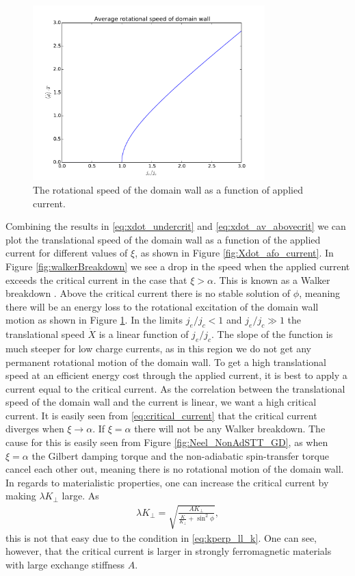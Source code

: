 \documentclass[12pt, a4paper]{article}		%
\numberwithin{equation}{section}
\begin{document}
\begin{figure}[h!]
\begin{center}
\includegraphics[width=0.8\textwidth]{Figures/criticalCurrentPhidot.pdf} 
\caption{The rotational speed of the domain wall as a function of applied current.}
\label{fig:phidot_afo_current} 
\end{center}
\end{figure}
Combining the results in \eqref{eq:xdot_undercrit} and \eqref{eq:xdot_av_abovecrit} we can plot the translational speed of the domain wall as a function of the applied current for different values of $\xi$, as shown in Figure \ref{fig:Xdot_afo_current}. In Figure \ref{fig:walkerBreakdown} we see a drop in the speed when the applied current exceeds the critical current in the case that $\xi > \alpha$. This is known as a Walker breakdown \cite{SchryerWalker1974}. Above the critical current there is no stable solution of $\phi$, meaning there will be an energy loss to the rotational excitation of the domain wall motion as shown in Figure \ref{fig:phidot_afo_current}. In the limits $j_e/j_c < 1$ and $j_e/j_c \gg 1$ the translational speed $\dot{X}$ is a linear function of $j_e/j_c$. The slope of the function is much steeper for low charge currents, as in this region we do not get any permanent rotational motion of the domain wall. To get a high translational speed at an efficient energy cost through the applied current, it is best to apply a current equal to the critical current. As the correlation between the translational speed of the domain wall and the current is linear, we want a high critical current. It is easily seen from \eqref{eq:critical_current} that the critical current diverges when $\xi \rightarrow \alpha$. If $\xi=\alpha$ there will not be any Walker breakdown. The cause for this is easily seen from Figure \ref{fig:Neel_NonAdSTT_GD}, as when $\xi=\alpha$ the Gilbert damping torque and the non-adiabatic spin-transfer torque cancel each other out, meaning there is no rotational motion of the domain wall. In regards to materialistic properties, one can increase the critical current by making $\lambda K_{\perp}$ large. As 
\begin{align}
\lambda K_{\perp} = \sqrt{\frac{AK_{\perp}}{\frac{K}{K_{\perp}}+\sin^2\phi}},
\end{align}
this is not that easy due to the condition in \eqref{eq:kperp_ll_k}. One can see, however, that the critical current is larger in strongly ferromagnetic materials with large exchange stiffness $A$.
\end{document}
